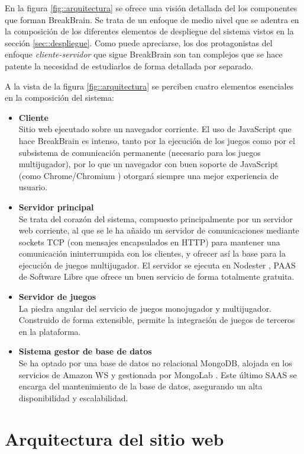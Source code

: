 En la figura \ref{fig::arquitectura} se ofrece una visión detallada del los componentes que forman BreakBrain. Se trata de un enfoque de medio nivel que se adentra en la composición de los diferentes elementos de despliegue del sistema vistos en la sección \ref{sec::despliegue}. Como puede apreciarse, los dos protagonistas del enfoque {\it cliente-servidor} que sigue BreakBrain son tan complejos que se hace patente la necesidad de estudiarlos de forma detallada por separado.

A la vista de la figura \ref{fig::arquitectura} se perciben cuatro elementos esenciales en la composición del sistema:

\begin{itemize}
\item {\bf Cliente}\\Sitio web ejecutado sobre un navegador corriente. El uso de JavaScript que hace BreakBrain es intenso, tanto por la ejecución de los juegos como por el subsistema de comunicación permanente (necesario para los juegos multijugador), por lo que un navegador con buen soporte de JavaScript (como Chrome/Chromium \cite{chrome}) otorgará siempre una mejor experiencia de usuario.
\item {\bf Servidor principal}\\Se trata del corazón del sistema, compuesto principalmente por un servidor web corriente, al que se le ha añaido un servidor de comunicaciones mediante sockets TCP (con mensajes encapsulados en HTTP) para mantener una comunicación ininterrumpida con los clientes, y ofrecer así la base para la ejecución de juegos multijugador. El servidor se ejecuta en Nodester \cite{Nodester}, \acf{PAAS} de Software Libre que ofrece un buen servicio de forma totalmente gratuita.
\item {\bf Servidor de juegos}\\La piedra angular del servicio de juegos monojugador y multijugador. Construido de forma extensible, permite la integración de juegos de terceros en la plataforma. 
\item {\bf Sistema gestor de base de datos}\\Se ha optado por una base de datos no relacional MongoDB, alojada en los servicios de Amazon WS \cite{Amazon} y gestionada por MongoLab \cite{Mongolab}. Este último \acf{SAAS} se encarga del mantenimiento de la base de datos, asegurando un alta disponibilidad y escalabilidad.
\end{itemize}

\section{Arquitectura del sitio web}

